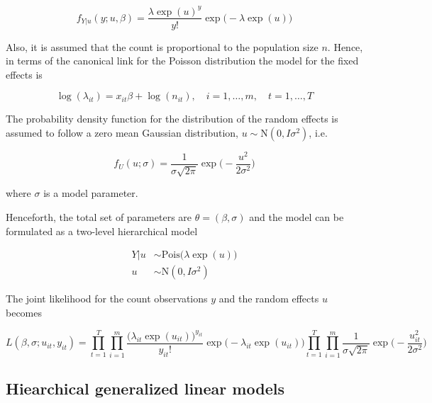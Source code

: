 \documentclass[preprint, 3p, authoryear]{elsarticle} %
\begin{document}
\begin{equation}
  f_{Y|u}(y; u, \beta)=\frac{\lambda\exp(u)^{y}}{y!}\exp\big(-\lambda\exp(u)\big)
\end{equation}

Also, it is assumed that the count is proportional to the population size \(n\). Hence, in terms of the canonical link for the Poisson distribution the model for the fixed effects is

\begin{equation}
\log(\lambda_{it})= x_{it} \beta + \log(n_{it}), \quad i=1,\dots,m, \quad t=1,\dots,T
\end{equation}

The probability density function for the distribution of the random effects is assumed to follow a zero mean Gaussian distribution, \(u\sim\mathrm{N}(0,I\sigma^2)\), i.e.

\begin{equation}
  f_U(u;\sigma)=\frac{1}{\sigma\sqrt{2\pi}}\exp\Bigg(-\frac{u^2}{2\sigma^2}\Bigg)
\end{equation}

where \(\sigma\) is a model parameter.

Henceforth, the total set of parameters are \(\theta=(\beta,\sigma)\) and the model can be formulated as a two-level hierarchical model

\begin{subequations} \label{eq:PoisN}
  \begin{alignat}{2}
    {Y|u} &\sim \mathrm{Pois} \big( \lambda \exp(u) \big) \label{eq:pois_n0} \\ 
    {u} &\sim \mathrm{N}({0},I\sigma^2) \label{eq:pois_n1}
  \end{alignat}
\end{subequations}

The joint likelihood for the count observations \(y\) and the random effects \(u\) becomes

\begin{equation}\label{eq:jnllPoisN}
  L(\beta, \sigma;u_{it},y_{it})=\prod_{t=1}^{T}\prod_{i=1}^{m} \frac{\big(\lambda_{it}\exp(u_{it})\big)^{y_{it}}}{y_{it}!}\exp\big(-\lambda_{it}\exp(u_{it})\big) \prod_{t=1}^{T}\prod_{i=1}^{m} \frac{1}{\sigma\sqrt{2\pi}}\exp\Bigg(-\frac{u_{it}^2}{2\sigma^2}\Bigg)
\end{equation}

\hypertarget{hiearchical-generalized-linear-models}{%
\subsection{\texorpdfstring{Hiearchical generalized linear models \label{hglm}}{Hiearchical generalized linear models }}\label{hiearchical-generalized-linear-models}}
\end{document}
